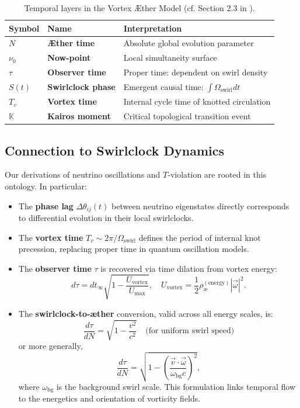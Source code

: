 \begin{table}[H]
\centering
\renewcommand{\arraystretch}{1.1}
\begin{tabular}{|l|l|l|}
\hline
\textbf{Symbol} & \textbf{Name} & \textbf{Interpretation} \\
\hline
$N$ & \textbf{Æther time} & Absolute global evolution parameter \\
$\nu_0$ & \textbf{Now-point} & Local simultaneity surface \\
$\tau$ & \textbf{Observer time} & Proper time: dependent on swirl density \\
$S(t)$ & \textbf{Swirlclock phase} & Emergent causal time: $\int \Omega_\text{swirl} dt$ \\
$T_v$ & \textbf{Vortex time} & Internal cycle time of knotted circulation \\
$\mathbb{K}$ & \textbf{Kairos moment} & Critical topological transition event \\
\hline
\end{tabular}
\caption{Temporal layers in the Vortex Æther Model (cf. Section 2.3 in \cite{iskandarani2025vam2}).}
\end{table}

\subsection*{Connection to Swirlclock Dynamics}

Our derivations of neutrino oscillations and $T$-violation are rooted in this ontology. In particular:

\begin{itemize}
    \item The \textbf{phase lag} $\Delta \theta_{ij}(t)$ between neutrino eigenstates directly corresponds to differential evolution in their local swirlclocks.
    \item The \textbf{vortex time} $T_v \sim 2\pi / \Omega_{\text{swirl}}$ defines the period of internal knot precession, replacing proper time in quantum oscillation models.
    \item The \textbf{observer time} $\tau$ is recovered via time dilation from vortex energy:
    \[
    d\tau = dt_\infty \sqrt{1 - \frac{U_{\text{vortex}}}{U_{\text{max}}}}, \quad
    U_{\text{vortex}} = \frac{1}{2} \rho_\text{\ae}^{(\text{energy})} |\vec{\omega}|^2.
    \]
    \item The \textbf{swirlclock-to-æther} conversion, valid across all energy scales, is:
    \[
    \frac{d\tau}{dN} = \sqrt{1 - \frac{v^2}{c^2}} \quad \text{(for uniform swirl speed)}
    \]
    or more generally,
    \[
    \frac{d\tau}{dN} = \sqrt{1 - \left( \frac{\vec{v} \cdot \vec{\omega}}{\omega_{\text{bg}} c} \right)^2},
    \]
    where $\omega_{\text{bg}}$ is the background swirl scale. This formulation links temporal flow to the energetics and orientation of vorticity fields.
\end{itemize}

